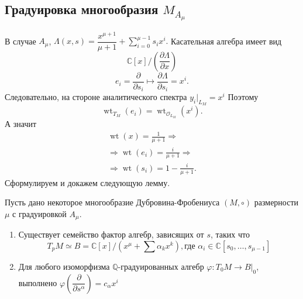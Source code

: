 \subsection{Градуировка многообразия \(M_{A_\mu}\)}
В случае \(A_\mu\), \(\Lambda(x,s)=\dfrac{x^{\mu+1}}{\mu+1}+\sum_{i=0}^{\mu-1}s_i x^i.\)
Касательная алгебра имеет вид\[\mathbb{C}[x]\Big/
\left(\frac{\partial\Lambda}{\partial x}\right)\]
\[
e_i=\frac{\partial}{\partial s_i}
\longmapsto
\frac{\partial\Lambda}{\partial s_i}
=
x^i.
\]
Следовательно, на стороне аналитического спектра \(y_i|_{L_M}=x^i\)
Поэтому
\[\operatorname{wt}_{T_M}(e_i)=\operatorname{wt}_{\mathcal O_{L_M}}(x^i).\]
А значит
\begin{equation} \label{grad}
	\begin{gathered}
		\operatorname{wt}(x)=\frac{1}{\mu+1}\Rightarrow\\
		\Rightarrow \operatorname{wt}(e_i)=\frac{i}{\mu+1}\Rightarrow\\
		\Rightarrow \operatorname{wt}(s_i)=1-\frac{i}{\mu+1}.
	\end{gathered}
\end{equation}
Сформулируем и докажем следующую лемму.
\begin{lem}\label{lem1}
	Пусть дано некоторое многообразие Дубровина-Фробениуса \((M, \circ)\) размерности \(\mu\) с градуировкой \(A_\mu\).
	\begin{enumerate}
		\item Существует семейство фактор алгебр, зависящих от \(s\), таких что 
		\[T_pM \simeq B = \mathbb{C}[x]/(x^{\mu} + \sum \alpha_k x^k), \text{где } \alpha_i \in \mathbb{C}[s_0, \dots, s_{\mu-1}]\]
		\item Для любого изоморфизма \(\mathbb{Q}\)-градуированных алгебр \(\varphi:T_0M \rightarrow B|_0\), выполнено \(\varphi\left(\dfrac{\partial}{\partial s^\alpha}\right) = c_\alpha x^i\)
	\end{enumerate}
\end{lem}
